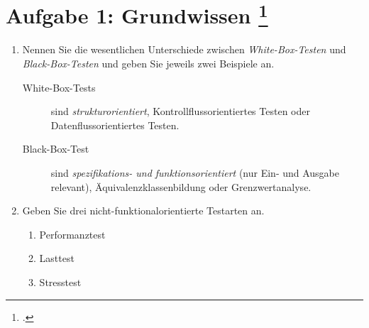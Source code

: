 \documentclass{bschlangaul-aufgabe}
\begin{document}

\section{Aufgabe 1: Grundwissen
\footcite{sosy:ab:7}}

\begin{enumerate}


\item Nennen Sie die wesentlichen Unterschiede zwischen
\emph{White-Box-Testen} und \emph{Black-Box-Testen} und geben Sie
jeweils zwei Beispiele an.

\begin{bAntwort}
\begin{description}
\item[White-Box-Tests]

sind \emph{strukturorientiert}, \zB
Kontrollflussorientiertes Testen oder Datenflussorientiertes Testen.

\item[Black-Box-Test]

sind \emph{spe\-zifi\-kations- und funktionsorientiert} (nur Ein- und
Ausgabe relevant), \zB Äquivalenzklassenbildung oder Grenzwertanalyse.
\end{description}
\end{bAntwort}


\item Geben Sie drei nicht-funktionalorientierte Testarten an.

\begin{bAntwort}
\begin{enumerate}
\item Performanztest
\item Lasttest
\item Stresstest
\end{enumerate}
\end{bAntwort}


\end{enumerate}
\end{document}
